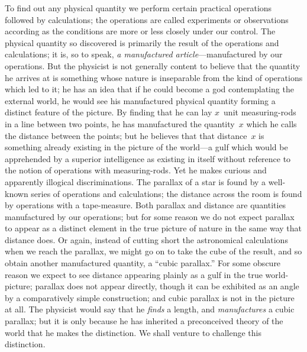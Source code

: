 \documentclass[12pt]{book}
\begin{document}
To find out any physical quantity we perform certain practical operations
followed by calculations; the operations are called experiments or observations
according as the conditions are more or less closely under our control. The
physical quantity so discovered is primarily the result of the operations and
calculations; it is, so to speak, \emph{a manufactured article}---manufactured by
%
our operations. But the physicist is not generally content to believe that the
quantity he arrives at is something whose nature is inseparable from the kind
of operations which led to it; he has an idea that if he could become a god
contemplating the external world, he would see his manufactured physical
quantity forming a distinct feature of the picture. By finding that he can
lay $x$~unit measuring\hyp{}rods in a line between two points, he has manufactured
the quantity~$x$ which he calls the distance between the points; but he believes
that that distance~$x$ is something already existing in the picture of the world---a
gulf which would be apprehended by a superior intelligence as existing
in itself without reference to the notion of operations with measuring\hyp{}rods.
Yet he makes curious and apparently illogical discriminations. The parallax
of a star is found by a well-known series of operations and calculations; the
distance across the room is found by operations with a tape\hyp{}measure. Both
parallax and distance are quantities manufactured by our operations; but
for some reason we do not expect parallax to appear as a distinct element in
the true picture of nature in the same way that distance does. Or again,
instead of cutting short the astronomical calculations when we reach the
parallax, we might go on to take the cube of the result, and so obtain another
manufactured quantity, a ``cubic parallax.'' For some obscure reason we
expect to see distance appearing plainly as a gulf in the true world\hyp{}picture;
parallax does not appear directly, though it can be exhibited as an angle by
a comparatively simple construction; and cubic parallax is not in the picture
at all. The physicist would say that he \emph{finds} a length, and \emph{manufactures} a
cubic parallax; but it is only because he has inherited a preconceived theory
of the world that he makes the distinction. We shall venture to challenge
this distinction.
\end{document}
